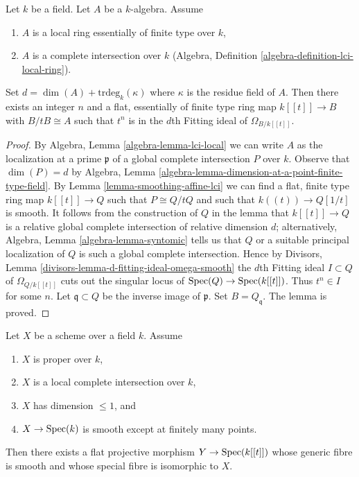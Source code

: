 \begin{lemma}
\label{lemma-smoothing-at-lci-point}
Let $k$ be a field. Let $A$ be a $k$-algebra. Assume
\begin{enumerate}
\item $A$ is a local ring essentially of finite type over $k$,
\item $A$ is a complete intersection over $k$
(Algebra, Definition \ref{algebra-definition-lci-local-ring}).
\end{enumerate}
Set $d = \dim(A) + \text{trdeg}_k(\kappa)$ where $\kappa$
is the residue field of $A$. Then there exists an integer $n$
and a flat, essentially of finite type ring map
$k[[t]] \to B$ with $B/tB \cong A$ such that $t^n$ is in the
$d$th Fitting ideal of $\Omega_{B/k[[t]]}$.
\end{lemma}

\begin{proof}
By Algebra, Lemma \ref{algebra-lemma-lci-local} we can write $A$ as the
localization at a prime $\mathfrak p$ of a global complete intersection $P$
over $k$. Observe that $\dim(P) = d$ by
Algebra, Lemma \ref{algebra-lemma-dimension-at-a-point-finite-type-field}.
By Lemma \ref{lemma-smoothing-affine-lci} we can find a
flat, finite type ring map $k[[t]] \to Q$ such that $P \cong Q/tQ$ and
such that $k((t)) \to Q[1/t]$ is smooth. It follows from the construction
of $Q$ in the lemma that $k[[t]] \to Q$ is a relative global
complete intersection of relative dimension $d$; alternatively,
Algebra, Lemma \ref{algebra-lemma-syntomic} tells us that $Q$ or a
suitable principal localization of $Q$ is such a global complete intersection.
Hence by Divisors, Lemma \ref{divisors-lemma-d-fitting-ideal-omega-smooth}
the $d$th Fitting ideal $I \subset Q$ of $\Omega_{Q/k[[t]]}$
cuts out the singular locus of $\mathop{\mathrm{Spec}}(Q) \to \mathop{\mathrm{Spec}}(k[[t]])$.
Thus $t^n \in I$ for some $n$.
Let $\mathfrak q \subset Q$
be the inverse image of $\mathfrak p$. Set $B = Q_\mathfrak q$.
The lemma is proved.
\end{proof}

\begin{lemma}
\label{lemma-smoothing-proper-curve-isolated-lci}
Let $X$ be a scheme over a field $k$. Assume
\begin{enumerate}
\item $X$ is proper over $k$,
\item $X$ is a local complete intersection over $k$,
\item $X$ has dimension $\leq 1$, and
\item $X \to \mathop{\mathrm{Spec}}(k)$ is smooth except at finitely many points.
\end{enumerate}
Then there exists a flat projective morphism $Y \to \mathop{\mathrm{Spec}}(k[[t]])$
whose generic fibre is smooth and whose special fibre is
isomorphic to $X$.
\end{lemma}

